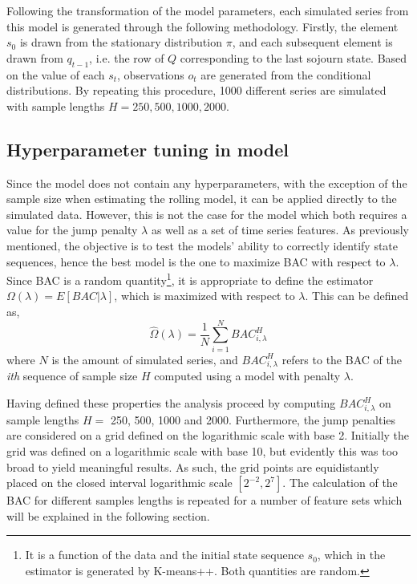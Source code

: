 Following the transformation of the model parameters, each simulated series from this model is generated through the following methodology. Firstly, the element $s_0$ is drawn from the stationary distribution $\pi$, and each subsequent element is drawn from $q_{t-1}$, i.e. the row of $Q$ corresponding to the last sojourn state. Based on the value of each $s_t$, observations $o_t$ are generated from the conditional distributions. By repeating this procedure, 1000 different series are simulated with sample lengths $H = 250, 500, 1000, 2000$.

\subsection{Hyperparameter tuning in \jump model}
\label{subsection: jump_penalizer}
Since the \mle model does not contain any hyperparameters, with the exception of the sample size when estimating the rolling model, it can be applied directly to the simulated data. However, this is not the case for the \jump model which both requires a value for the jump penalty $\lambda$ as well as a set of time series features. As previously mentioned, the objective is to test the models' ability to correctly identify state sequences, hence the best \jump model is the one to maximize BAC with respect to $\lambda$. Since BAC is a random quantity\footnote
{It is a function of the data and the initial state sequence $s_0$, which in the \jump estimator is generated by K-means++. Both quantities are random.},
it is appropriate to define the estimator $\Omega(\lambda)= E[BAC|\lambda]$, which is maximized with respect to $\lambda$. This can be defined as, 
\begin{equation}
    \hat\Omega(\lambda) = \frac{1}{N} \sum_{i=1}^N BAC_{i, \lambda}^H
\end{equation}
where $N$ is the amount of simulated series, and $BAC_{i, \lambda}^H$ refers to the BAC of the \textit{ith} sequence of sample size $H$ computed using a \jump model with penalty $\lambda$.

Having defined these properties the analysis proceed by computing $BAC_{i, \lambda}^H$ on sample lengths $H =$ 250, 500, 1000 and 2000. Furthermore, the jump penalties are considered on a grid defined on the logarithmic scale with base 2. Initially the grid was defined on a logarithmic scale with base 10, but evidently this was too broad to yield meaningful results. As such, the grid points are equidistantly placed on the closed interval logarithmic scale $[2^{-2}, 2^{7}]$. The calculation of the BAC for different samples lengths is repeated for a number of feature sets which will be explained in the following section.

